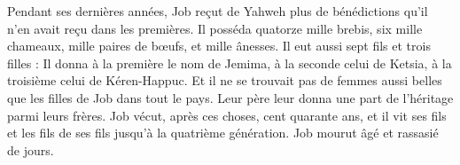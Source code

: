 \begin{multicols}{2}
Pendant ses dernières années, Job reçut de Yahweh plus de bénédictions qu'il n'en avait reçu dans les premières. Il posséda quatorze mille brebis, six mille chameaux, mille paires de bœufs, et mille ânesses.
Il eut aussi sept fils et trois filles :
Il donna à la première le nom de Jemima, à la seconde celui de Ketsia, à la troisième celui de Kéren-Happuc.
Et il ne se trouvait pas de femmes aussi belles que les filles de Job dans tout le pays. Leur père leur donna une part de l'héritage parmi leurs frères.
Job vécut, après ces choses, cent quarante ans, et il vit ses fils et les fils de ses fils jusqu'à la quatrième génération.
 Job mourut âgé et rassasié de jours.
\PPE{}
\end{multicols}
